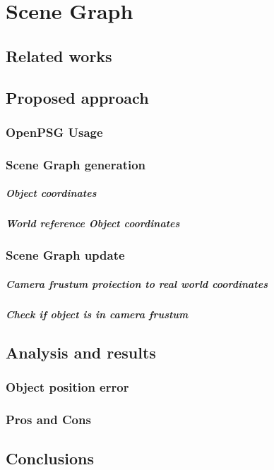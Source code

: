 \chapter{Scene Graph}


\section{Related works}


\section{Proposed approach}

\subsection{OpenPSG Usage}

\subsection{Scene Graph generation}
\paragraph{Object coordinates}
\paragraph{World reference Object coordinates}

\subsection{Scene Graph update}
\paragraph{Camera frustum proiection to real world coordinates}
\paragraph{Check if object is in camera frustum}


\section{Analysis and results}

\subsection{Object position error}
\subsection{Pros and Cons}

\section{Conclusions}

